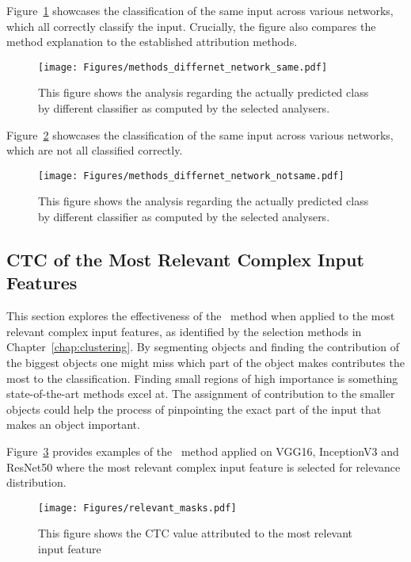 Figure~\ref{Fig:compare_models_same} showcases the classification of the same input across various networks, which all correctly classify the input. Crucially, the figure also compares the \CTC method explanation to the established attribution methods.

\begin{figure}[ht!]
	\begin{center}
		\texttt{[image: Figures/methods\_differnet\_network\_same.pdf]}
	\end{center}
	\caption{This figure shows the analysis regarding the actually predicted class by different classifier as computed by the selected analysers.}
	\label{Fig:compare_models_same}
\end{figure} 

Figure~\ref{Fig:compare_models_not_same} showcases the classification of the same input across various networks, which are not all classified correctly.

\begin{figure}[ht!]
	\begin{center}
		\texttt{[image: Figures/methods\_differnet\_network\_notsame.pdf]}
	\end{center}
	\caption{This figure shows the analysis regarding the actually predicted class by different classifier as computed by the selected analysers.}
	\label{Fig:compare_models_not_same}
\end{figure} 


\subsection{CTC of the Most Relevant Complex Input Features}

This section explores the effectiveness of the \CTC\ method when applied to the most relevant complex input features, as identified by the selection methods in Chapter~\ref{chap:clustering}. By segmenting objects and finding the contribution of the biggest objects one might miss which part of the object makes contributes the most to the classification. Finding small regions of high importance is something state-of-the-art methods excel at. The assignment of contribution to the smaller objects could help the process of pinpointing the exact part of the input that makes an object important.

Figure~\ref{Fig:small_parts} provides examples of the \CTC\ method applied on VGG16, InceptionV3 and ResNet50 where the most relevant complex input feature is selected for relevance distribution.
\begin{figure}[ht!]
	\begin{center}
		\texttt{[image: Figures/relevant\_masks.pdf]}
	\end{center}
	\caption{This figure shows the CTC value attributed to the most relevant input feature}
	\label{Fig:small_parts}
\end{figure} 



